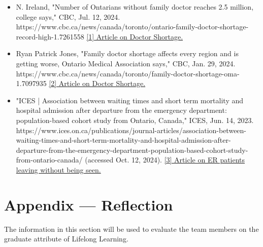 \documentclass[12pt]{article}
\begin{document}
\begin{itemize}
  \item
  [1]N. Ireland, "Number of Ontarians without family doctor reaches 2.5 million, college says," CBC, Jul. 12, 2024. https://www.cbc.ca/news/canada/toronto/ontario-family-doctor-shortage-record-high-1.7261558
  \href{https://www.cbc.ca/news/canada/toronto/ontario-family-doctor-shortage-record-high-1.7261558}{[1] Article on Doctor Shortage.}
  \item 
  [2]Ryan Patrick Jones, "Family doctor shortage affects every region and is getting worse, Ontario Medical Association says," CBC, Jan. 29, 2024. https://www.cbc.ca/news/canada/toronto/family-doctor-shortage-oma-1.7097935
  \href{https://www.cbc.ca/news/canada/toronto/family-doctor-shortage-oma-1.7097935}{[2] Article on Doctor Shortage.}
  \item
  [3]"ICES | Association between waiting times and short term mortality and hospital admission after departure from the emergency department: population-based cohort study from Ontario, Canada," ICES, Jun. 14, 2023. https://www.ices.on.ca/publications/journal-articles/association-between-waiting-times-and-short-term-mortality-and-hospital-admission-after-departure-from-the-emergency-department-population-based-cohort-study-from-ontario-canada/ (accessed Oct. 12, 2024).
  \href{https://www.ices.on.ca/publications/journal-articles/association-between-waiting-times-and-short-term-mortality-and-hospital-admission-after-departure-from-the-emergency-department-population-based-cohort-study-from-ontario-canada/}{[3] Article on ER patients leaving without being seen.}
\end{itemize}

\newpage{}
\section*{Appendix --- Reflection}


The information in this section will be used to evaluate the team members on the
graduate attribute of Lifelong Learning.  


\end{document}
